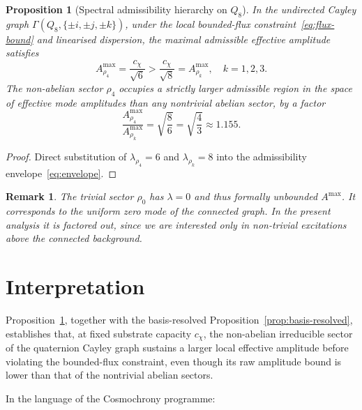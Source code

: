 \documentclass[11pt,a4paper]{article}
\newtheorem{proposition}{Proposition}
\newtheorem{remark}{Remark}
\begin{document}
  \begin{proposition}[Spectral admissibility hierarchy on $Q_8$]
    \label{prop:main}
    In the undirected Cayley graph $\Gamma(Q_8, \{\pm i, \pm j, \pm k\})$,
    under the local bounded-flux constraint~\eqref{eq:flux-bound} and linearised
    dispersion, the maximal admissible effective amplitude satisfies
    \begin{equation}
      A^{\max}_{\rho_4} = \frac{c_\chi}{\sqrt{6}} > \frac{c_\chi}{\sqrt{8}}
      = A^{\max}_{\rho_k}, \quad k = 1, 2, 3.
    \end{equation}
    The non-abelian sector $\rho_4$ occupies a strictly larger admissible region in the
    space of effective mode amplitudes than any nontrivial abelian sector, by a factor
    \begin{equation}
      \frac{A^{\max}_{\rho_4}}{A^{\max}_{\rho_k}}
      =
      \sqrt{\frac{8}{6}}
      =
      \sqrt{\frac{4}{3}}
      \approx 1.155.
    \end{equation}
  \end{proposition}

  \begin{proof}
    Direct substitution of $\lambda_{\rho_4} = 6$ and $\lambda_{\rho_k} = 8$
    into the admissibility envelope~\eqref{eq:envelope}.
  \end{proof}

  \begin{remark}
    The trivial sector $\rho_0$ has $\lambda = 0$ and thus formally unbounded $A^{\max}$.
    It corresponds to the uniform zero mode of the connected graph.
    In the present analysis it is factored out, since we are interested only in
    non-trivial excitations above the connected background.
  \end{remark}

  \section{Interpretation}

  Proposition~\ref{prop:main}, together with the basis-resolved
  Proposition~\ref{prop:basis-resolved}, establishes that, at fixed substrate capacity
  $c_\chi$, the non-abelian irreducible sector of the quaternion Cayley graph sustains
  a larger local effective amplitude before violating the bounded-flux constraint,
  even though its raw amplitude bound is lower than that of the nontrivial abelian
  sectors.

  In the language of the Cosmochrony programme:
\end{document}
